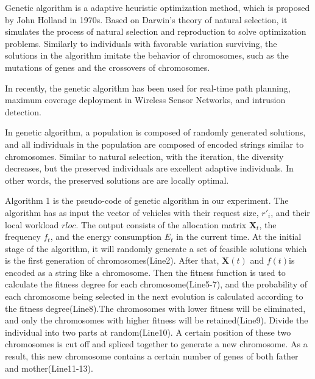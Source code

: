 \documentclass[conference]{IEEEtran}
\begin{document}
	Genetic algorithm is a adaptive heuristic optimization method, which is proposed by John Holland in 1970s\cite{gafirst}. Based on Darwin's theory of natural selection, it simulates the process of natural selection and reproduction to solve optimization problems. 
	Similarly to individuals with favorable variation surviving, the solutions in the algorithm imitate the behavior of chromosomes, such as the mutations of genes and the crossovers of chromosomes.
	
	In recently, the genetic algorithm has been used for real-time path planning\cite{gapathplan}, maximum coverage deployment in Wireless Sensor Networks\cite{GANetwork}, and intrusion detection\cite{GAIntrusionDetection}. 

	In genetic algorithm, a population is composed of randomly generated solutions, and all individuals in the population are composed of encoded strings similar to chromosomes\cite{gaguocheng}.
	Similar to natural selection, with the iteration, the diversity decreases, but the preserved individuals are excellent adaptive individuals. In other words, the preserved solutions are are locally optimal.

	Algorithm 1 is the pseudo-code of genetic algorithm in our experiment. The algorithm has as input the vector of vehicles with their request size, $r'_i$, and their local workload $rloc $. The output consists of the allocation matrix $ \mathbf{X}_t$, the frequency $f_t$, and the energy consumption $E_t$ in the current time. 
	At the initial stage of the algorithm, it will randomly generate a set of feasible solutions which is the first generation of chromosomes(Line2).
	After that, $\mathbf{X}(t) $ and $ f(t)$is encoded as a string like a chromosome.
	Then the fitness function is used to calculate the fitness degree for each chromosome(Line5-7), and the probability of each chromosome being selected in the next evolution is calculated according to the fitness degree(Line8).The chromosomes with lower fitness will be eliminated, and only the chromosomes with higher fitness will be retained(Line9).
	Divide the individual into two parts at random(Line10).
	A certain position of these two chromosomes is cut off and spliced together to generate a new chromosome. As a result, this new chromosome contains a certain number of genes of both father and mother(Line11-13).
\end{document}
